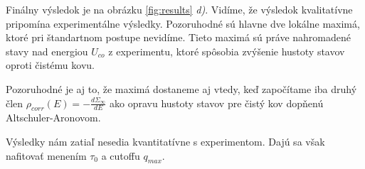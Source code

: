 Finálny výsledok je na obrázku \ref{fig:results} {\it d)}. Vidíme, že výsledok kvalitatívne pripomína experimentálne výsledky. Pozoruhodné sú hlavne dve lokálne maximá, ktoré pri štandartnom postupe nevidíme. Tieto maximá sú práve nahromadené stavy nad energiou $U_{co}$ z experimentu, ktoré spôsobia zvýšenie hustoty stavov oproti čistému kovu. 

Pozoruhodné je aj to, že maximá dostaneme aj vtedy, keď započítame iba druhý člen  $\rho_{corr}(E)=-\frac{d\Sigma_{\infty}}{dE}$ ako opravu hustoty stavov pre čistý kov dopňenú Altschuler-Aronovom.

Výsledky nám zatiaľ nesedia kvantitatívne s experimentom. Dajú sa však nafitovať menením $\tau_0$ a cutoffu $q_{max}$.

